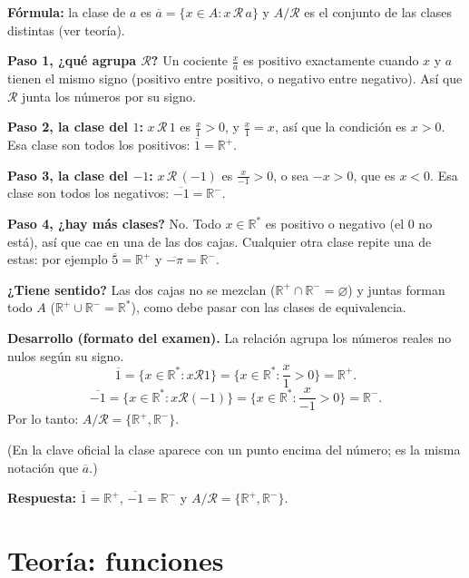 \documentclass[11pt]{article}
\newcommand{\R}{\mathcal{R}}
\begin{document}

\begin{explica}
\textbf{Fórmula:} la clase de $a$ es $\overline a=\{x\in A: x\,\R\,a\}$ y $A/\R$ es el conjunto de las clases distintas (ver teoría).

\textbf{Paso 1, ¿qué agrupa $\R$?} Un cociente $\frac xa$ es positivo exactamente cuando $x$ y $a$ tienen el mismo signo (positivo entre positivo, o negativo entre negativo). Así que $\R$ junta los números por su signo.

\textbf{Paso 2, la clase del $1$:} $x\,\R\,1$ es $\frac x1>0$, y $\frac x1=x$, así que la condición es $x>0$. Esa clase son todos los positivos: $\overline1=\mathbb R^+$.

\textbf{Paso 3, la clase del $-1$:} $x\,\R\,(-1)$ es $\frac{x}{-1}>0$, o sea $-x>0$, que es $x<0$. Esa clase son todos los negativos: $\overline{-1}=\mathbb R^-$.

\textbf{Paso 4, ¿hay más clases?} No. Todo $x\in\mathbb R^*$ es positivo o negativo (el $0$ no está), así que cae en una de las dos cajas. Cualquier otra clase repite una de estas: por ejemplo $\overline{5}=\mathbb R^+$ y $\overline{-\pi}=\mathbb R^-$.

\textbf{¿Tiene sentido?} Las dos cajas no se mezclan ($\mathbb R^+\cap\mathbb R^-=\varnothing$) y juntas forman todo $A$ ($\mathbb R^+\cup\mathbb R^-=\mathbb R^*$), como debe pasar con las clases de equivalencia.
\end{explica}

\textbf{Desarrollo (formato del examen).} La relación agrupa los números reales no nulos según su signo.
\[
\overline1=\{x\in\mathbb R^*: x\R1\}=\Big\{x\in\mathbb R^*:\frac x1>0\Big\}=\mathbb R^+.
\]
\[
\overline{-1}=\{x\in\mathbb R^*: x\R(-1)\}=\Big\{x\in\mathbb R^*:\frac x{-1}>0\Big\}=\mathbb R^-.
\]
Por lo tanto: $A/\R=\{\mathbb R^+,\mathbb R^-\}$.

{\small (En la clave oficial la clase aparece con un punto encima del número; es la misma notación que $\overline{a}$.)}

\textbf{Respuesta:} $\overline1=\mathbb R^+$, $\overline{-1}=\mathbb R^-$ y $A/\R=\{\mathbb R^+,\mathbb R^-\}$.

\clearpage
\section*{Teoría: funciones}
\end{document}
